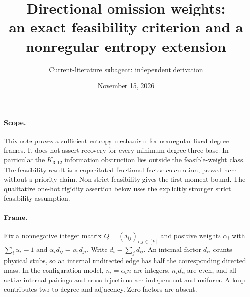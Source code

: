 \documentclass[11pt]{article}
\title{Directional omission weights:\\an exact feasibility criterion and a nonregular entropy extension}
\author{Current-literature subagent: independent derivation}
\date{November 15, 2026}
\begin{document}
\maketitle

\paragraph{Scope.}
This note proves a sufficient entropy mechanism for nonregular fixed
degree frames. It does not assert recovery for every minimum-degree-three
base. In particular the $K_{3,12}$ information obstruction lies outside
the feasible-weight class. The feasibility result is a capacitated
fractional-factor calculation, proved here without a priority claim.
Non-strict feasibility gives the first-moment bound. The qualitative
one-hot rigidity assertion below uses the explicitly stronger strict
feasibility assumption.

\paragraph{Frame.}
Fix a nonnegative integer matrix $Q=(d_{ij})_{i,j\in[k]}$ and positive
weights $\alpha_i$ with $\sum_i\alpha_i=1$ and
$\alpha_i d_{ij}=\alpha_jd_{ji}$. Write $d_i=\sum_jd_{ij}$.
An internal factor $d_{ii}$ counts physical stubs, so an internal
undirected edge has half the corresponding directed mass. In the
configuration model, $n_i=\alpha_i n$ are integers,
$n_id_{ii}$ are even, and all active internal pairings and cross
bijections are independent and uniform. A loop contributes two to
degree and adjacency. Zero factors are absent.
\end{document}
